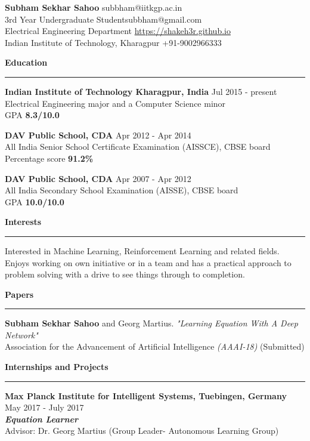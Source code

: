 \documentclass[10pt]{article}
\newcommand{\heading}[1]{
 {\large \textbf{#1}}
  \vspace{0.4em}
  \hrule
  \vspace{0.4em}
}
\newcommand{\EntryGap}{\vspace{0.4  cm}}
\newcommand{\SmallEntryGap}{\vspace{0.2cm}}
\begin{document}

{\Large \textbf{Subham Sekhar Sahoo}} \hfill subbham@iitkgp.ac.in\\
3rd Year Undergraduate Student\hfill subbham@gmail.com\\
Electrical Engineering Department \hfill \url{https://shakeh3r.github.io}\\
Indian Institute of Technology, Kharagpur \hfill  +91-9002966333  
\EntryGap



\heading{Education}

\textbf{Indian Institute of Technology Kharagpur, India} \hfill Jul 2015 - present\\
Electrical Engineering major and a Computer Science minor\\
GPA \textbf{8.3/10.0}

\SmallEntryGap
\textbf{DAV Public School, CDA} \hfill Apr 2012 - Apr 2014\\
All India Senior School Certificate Examination (AISSCE), CBSE board\\
Percentage score \textbf{91.2\%}

\SmallEntryGap
\textbf{DAV Public School, CDA} \hfill Apr 2007 - Apr 2012\\
All India Secondary School Examination (AISSE), CBSE board\\
GPA \textbf{10.0/10.0}

\EntryGap
\heading{Interests}

Interested in Machine Learning, Reinforcement Learning and related fields. Enjoys working on own initiative or in a team and has a practical approach to problem solving with a drive to see things through to completion.

\EntryGap

\heading{Papers}
  
  \textbf{Subham Sekhar Sahoo} and Georg Martius.  \emph{"Learning Equation With A Deep Network"}\\
  Association for the Advancement of Artificial Intelligence \emph{(AAAI-18)}
  (Submitted)
\EntryGap

\heading{Internships and Projects}

\textbf{Max Planck Institute for Intelligent Systems, Tuebingen, Germany} \hfill May 2017 - July 2017\\
\textbf{\emph{Equation Learner}}\\
Advisor: Dr. Georg Martius (Group Leader- Autonomous Learning Group)
\end{document}
